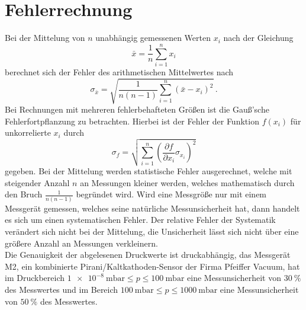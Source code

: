 \section{Fehlerrechnung}
\label{sec:fehler}

\noindent Bei der Mittelung von $n$ unabhängig gemessenen Werten $x_i$ nach der Gleichung 
\begin{equation*}
    \bar{x} = \frac{1}{n} \sum_{i=1}^n x_i
\end{equation*}
berechnet sich der Fehler des arithmetischen Mittelwertes nach
\begin{equation}
    \sigma_{\bar{x}} = \sqrt{\frac{1}{n(n-1)}\sum_{i=1}^n \left( \bar{x} - x_i \right)^2}\, .
    \label{eqn:err_arth_middel}
\end{equation} 
Bei Rechnungen mit mehreren fehlerbehafteten Größen ist die Gauß'sche Fehlerfortpflanzung zu betrachten. Hierbei ist der Fehler der Funktion $f(x_i)$ 
für unkorrelierte $x_i$  durch
\begin{equation}
    \sigma_f = \sqrt{\sum_{i=1}^n \left(\frac{\partial f}{\partial x_i} \sigma_{x_i}\right)^2}
    \label{eqn:gauss}
\end{equation}
gegeben.
Bei der Mittelung werden statistische Fehler ausgerechnet, welche mit steigender Anzahl $n$ an Messungen kleiner werden, welches mathematisch durch den Bruch $\frac{1}{n(n-1)}$ begründet wird. 
Wird eine Messgröße nur mit einem Messgerät gemessen, welches seine natürliche Messunsicherheit hat, dann handelt es sich um einen systematischen Fehler. 
Der relative Fehler der Systematik verändert sich nicht bei der Mittelung, die Unsicherheit lässt sich nicht über eine größere Anzahl an Messungen verkleinern.\\
Die Genauigkeit der abgelesenen Druckwerte ist druckabhängig, das Messgerät M2, ein kombinierte Pirani/Kaltkathoden-Sensor der Firma Pfeiffer Vacuum, hat im Druckbereich $ \SI{1e-8}{\milli\bar} \leq p \leq \SI{100}{\milli\bar}$ eine Messunsicherheit von 
$\SI{30}{\percent}$ des Messwertes und im Bereich $\SI{100}{\milli\bar} \leq p \leq \SI{1000}{\milli\bar}$ eine Messunsicherheit von $\SI{50}{\percent}$ des Messwertes. 

